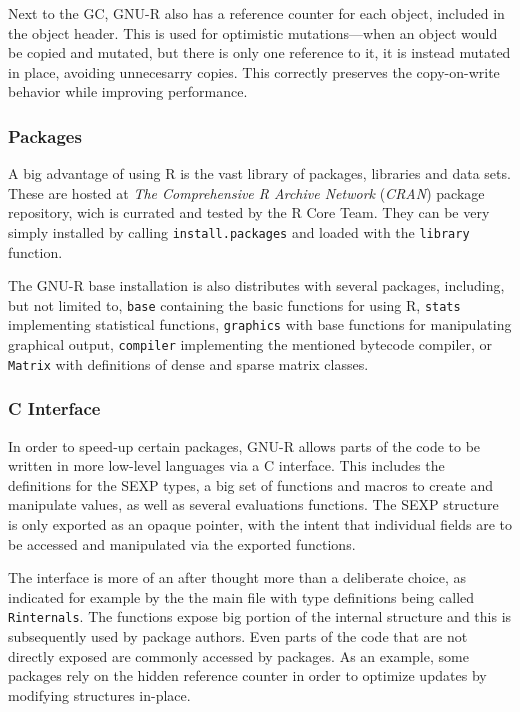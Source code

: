 Next to the GC, GNU-R also has a reference counter for each object, included in the object header. This is used for optimistic mutations---when an object would be copied and mutated, but there is only one reference to it, it is instead mutated in place, avoiding unnecesarry copies. This correctly preserves the copy-on-write behavior while improving performance.

\subsubsection*{Packages}

A big advantage of using R is the vast library of packages, libraries and data sets. These are hosted at \textit{The Comprehensive R Archive Network} (\textit{CRAN})\cite{cran} package repository, wich is currated and tested by the R Core Team. They can be very simply installed by calling \texttt{install.packages} and loaded with the \texttt{library} function.

The GNU-R base installation is also distributes with several packages, including, but not limited to, \texttt{base} containing the basic functions for using R, \texttt{stats} implementing statistical functions, \texttt{graphics} with base functions for manipulating graphical output, \texttt{compiler} implementing the mentioned bytecode compiler, or \texttt{Matrix} with definitions of dense and sparse matrix classes.

\subsubsection*{C Interface}

In order to speed-up certain packages, GNU-R allows parts of the code to be written in more low-level languages via a C interface. This includes the definitions for the SEXP types, a big set of functions and macros to create and manipulate values, as well as several evaluations functions. The SEXP structure is only exported as an opaque pointer, with the intent that individual fields are to be accessed and manipulated via the exported functions.

The interface is more of an after thought more than a deliberate choice, as indicated for example by the the main file with type definitions being called \texttt{Rinternals}. The functions expose big portion of the internal structure and this is subsequently used by package authors. Even parts of the code that are not directly exposed are commonly accessed by packages. As an example, some packages rely on the hidden reference counter in order to optimize updates by modifying structures in-place.

